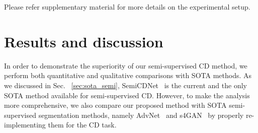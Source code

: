 \documentclass[runningheads]{llncs}
\begin{document}
Please refer supplementary material for more details on the experimental setup.

\vspace{-4mm}
\section{Results and discussion}
\vspace{-3mm}
In order to demonstrate the superiority of our semi-supervised CD method, we perform both quantitative and qualitative comparisons with SOTA methods. As we discussed in Sec. ~\ref{sec:sota_semi}, SemiCDNet~\cite{SemiCDNet} is the current and the only SOTA method available for semi-supervised CD. However, to make the analysis more comprehensive, we also compare our proposed method with SOTA semi-supervised segmentation methods, namely AdvNet~\cite{advnet} and s4GAN~\cite{s4GAN} by properly re-implementing them for the CD task.
\end{document}
